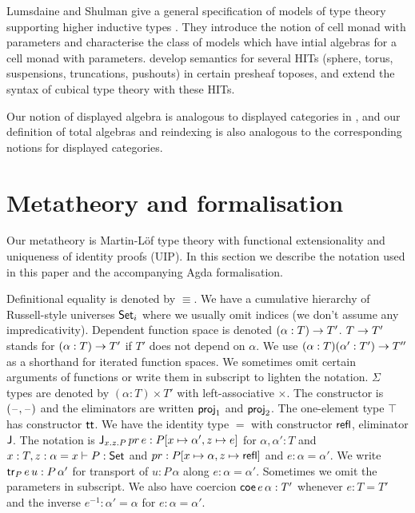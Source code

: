 \documentclass[acmsmall,review]{acmart}\settopmatter{printfolios=true,printccs=false,printacmref=false}
\begin{document}
Lumsdaine and Shulman give a general specification of
models of type theory supporting higher inductive types
\cite{lumsdaineShulman}. They introduce the notion of cell monad with
parameters and characterise the class of models which have intial
algebras for a cell monad with parameters. \cite{cubicalhits} develop
semantics for several HITs (sphere, torus, suspensions, truncations,
pushouts) in certain presheaf toposes, and extend the syntax of
cubical type theory \cite{ctt} with these HITs.

Our notion of displayed algebra is analogous to displayed categories
in \cite{displayedCategories}, and our definition of total algebras
and reindexing is also analogous to the corresponding notions for
displayed categories.


\section{Metatheory and formalisation}
\label{sec:metatheory}

Our metatheory is Martin-L{\"o}f type theory with functional
extensionality and uniqueness of identity proofs (UIP). In this
section we describe the notation used in this paper and the accompanying
Agda formalisation.

Definitional equality is denoted by $\equiv$. We have a cumulative
hierarchy of Russell-style universes $\Set_i$ where we usually omit
indices (we don't assume any impredicativity). Dependent function
space is denoted $(\alpha:T)\ra T'$. $T\ra T'$ stands for
$(\alpha:T)\ra T'$ if $T'$ does not depend on $\alpha$. We use
$(\alpha:T)(\alpha': T')\ra T''$ as a shorthand for iterated function
spaces. We sometimes omit certain arguments of functions or write them
in subscript to lighten the notation.  $\Sigma$ types are denoted by
$(\alpha:T)\times T'$ with left-associative $\times$. The constructor
is $(\blank,\blank)$ and the eliminators are written $\proj_1$ and
$\proj_2$. The one-element type $\top$ has constructor $\tt$. We have
the identity type $=$ with constructor $\refl$, eliminator $\J$. The
notation is $\J_{x.z.P}\,pr\,e:P[x\mapsto\alpha',z\mapsto e]$ for
$\alpha,\alpha':T$ and $x:T, z:\alpha=x \vdash P:\Set$ and
$pr:P[x\mapsto \alpha,z\mapsto\refl]$ and $e :\alpha=\alpha'$. We
write $\tr_P\,e\,u: P\,\alpha'$ for transport of $u : P\,\alpha$ along
$e :\alpha=\alpha'$. Sometimes we omit the parameters in subscript. We
also have coercion $\coe\,e\,\alpha:T'$ whenever $e:T=T'$ and the
inverse $e^{-1}:\alpha'=\alpha$ for $e:\alpha=\alpha'$.
\end{document}
